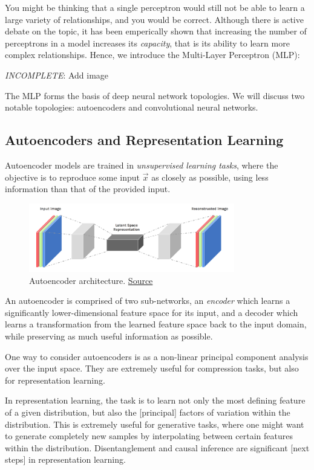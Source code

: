 \documentclass[paper=a4, fontsize=12pt]{scrartcl} %
\numberwithin{equation}{section} %
\numberwithin{figure}{section} %
\numberwithin{table}{section} %
\begin{document}
You might be thinking that a single perceptron would still not be able to learn a large variety of relationships, and you would be correct. Although there 
is active debate on the topic, it has been emperically shown that increasing the number of perceptrons in a model increases its \textit{capacity}\cite{vcdim}, that is 
its ability to learn more complex relationships. Hence, we introduce the Multi-Layer Perceptron (MLP):

\textit{INCOMPLETE}: Add image

The MLP forms the basis of deep neural network topologies. We will discuss two notable topologies: autoencoders and convolutional neural networks.

\pagebreak

\subsection{Autoencoders and Representation Learning}

Autoencoder models are trained in \textit{unsupervised learning tasks}, where the objective is to reproduce some input $\vec{x}$ as closely as possible, using less information
than that of the provided input.

\begin{figure}[H]
    \centering
    \includegraphics[width=0.8\textwidth]{images/autoencoder}
    \caption{Autoencoder architecture. \href{https://hackernoon.com/autoencoders-deep-learning-bits-1-11731e200694}{Source}}
\end{figure}

An autoencoder is comprised of two sub-networks, an \textit{encoder} which learns a significantly lower-dimensional feature space for its input, and a decoder 
which learns a transformation from the learned feature space back to the input domain, while preserving as much useful information as possible.

One way to consider autoencoders is as a non-linear principal component analysis over the input space. They are extremely useful for compression tasks, but also for 
representation learning.

In representation learning, the task is to learn not only the most defining feature of a given distribution, but also the [principal] factors of 
variation within the distribution. This is extremely useful for generative tasks, where one might want to generate completely new samples by interpolating 
between certain features within the distribution. Disentanglement and causal inference are significant [next steps] in representation learning.
\end{document}

